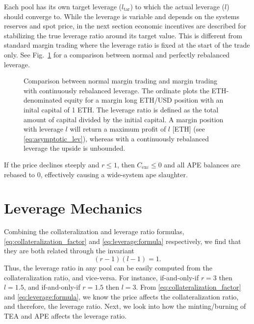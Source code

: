 \documentclass[journal,letterpaper,oneside,onecolumn,12pt]{IEEEtran}
\begin{document}
	Each pool has its own target leverage ($l_\textrm{tar}$) to which the actual leverage ($l$) should converge to.
	While the leverage is variable and depends on the systems reserves and spot price, in the next section economic incentives are described for stabilizing the true leverage ratio around its target value. This is different from standard margin trading where the leverage ratio is fixed at the start of the trade only. See Fig.~\ref{fig:leverage} for a comparison between normal and perfectly rebalanced leverage.
	\begin{figure}
		\centering
		\caption{Comparison between normal margin trading and margin trading with continuously rebalanced leverage. The ordinate plots the ETH-denominated equity for a margin long ETH/USD position with an inital capital of 1 ETH. The leverage ratio is defined as the total amount of capital divided by the initial capital. A margin position with leverage $l$ will return a maximum profit of $l$ [ETH] (see \eqref{eq:asymptotic_lev}), whereas with a continuously rebalanced leverage the upside is unbounded.}
		\label{fig:leverage}
	\end{figure} 
	If the price declines steeply and $r\leq1$, then $C_\text{exc}\leq0$ and all APE balances are rebased to 0, effectively causing a wide-system ape slaughter.


	



	\section{Leverage Mechanics} \label{sec:leverage}
	
	Combining the collateralization and leverage ratio formulas, \eqref{eq:collateralization_factor} and  \eqref{eq:leverage:formula} respectively, we find that they are both related through the invariant
	\begin{equation} \label{eq:leverage:invariant}
		(r-1)(l-1) = 1.
	\end{equation}
	Thus, the leverage ratio in any pool can be easily computed from the collateralization ratio, and vice-versa. For instance, if-and-only-if $r=3$ then $l=1.5$, and if-and-only-if $r=1.5$ then $l=3$. From \eqref{eq:collateralization_factor} and \eqref{eq:leverage:formula}, we know the price affects the collateralization ratio, and therefore, the leverage ratio. Next, we look into how the minting/burning of TEA and APE affects the leverage ratio.
	
\end{document}

